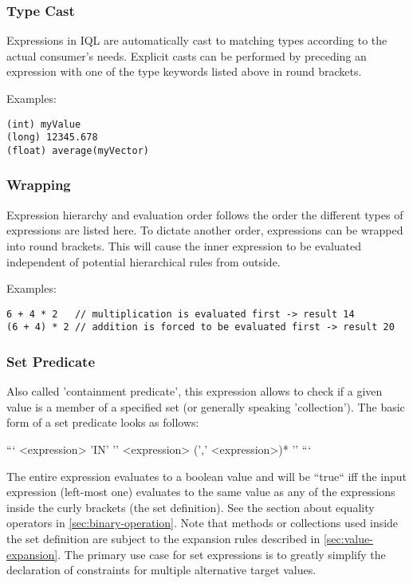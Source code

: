 \documentclass[11pt]{article}
\begin{document}
\subsubsection{Type Cast}
\label{sec:type-cast}

Expressions in IQL are automatically cast to matching types according to the actual consumer's needs. Explicit casts can be performed by preceding an expression with one of the type keywords listed above in round brackets.

Examples:

\begin{verbatim}
(int) myValue
(long) 12345.678
(float) average(myVector)
\end{verbatim}

\subsubsection{Wrapping}
\label{sec:wrapping}

Expression hierarchy and evaluation order follows the order the different types of expressions are listed here. To dictate another order, expressions can be wrapped into round brackets. This will cause the inner expression to be evaluated independent of potential hierarchical rules from outside.

Examples:

\begin{verbatim}
6 + 4 * 2   // multiplication is evaluated first -> result 14
(6 + 4) * 2 // addition is forced to be evaluated first -> result 20
\end{verbatim}

\subsubsection{Set Predicate}
\label{sec:set-predicate}

Also called 'containment predicate', this expression allows to check if a given value is a member of a specified set (or generally speaking 'collection'). The basic form of a set predicate looks as follows:

```
<expression> 'IN' '{' <expression> (',' <expression>)* '}' 
```

The entire expression evaluates to a boolean value and will be ``true`` iff the input expression (left-most one) evaluates to the same value as any of the expressions inside the curly brackets (the set definition). See the section about equality operators in \cref{sec:binary-operation}. Note that methods or collections used inside the set definition are subject to the expansion rules described in \cref{sec:value-expansion}. The primary use case for set expressions is to greatly simplify the declaration of constraints for multiple alternative target values. 
\end{document}
